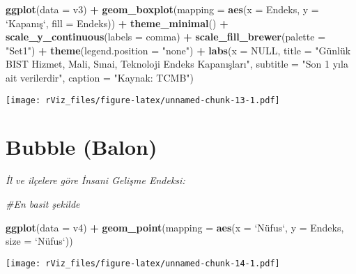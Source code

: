 \documentclass[
]{book}
\newenvironment{Shaded}{\begin{snugshade}}{\end{snugshade}}
\newcommand{\CommentTok}[1]{\textcolor[rgb]{0.56,0.35,0.01}{\textit{#1}}}
\newcommand{\DataTypeTok}[1]{\textcolor[rgb]{0.13,0.29,0.53}{#1}}
\newcommand{\KeywordTok}[1]{\textcolor[rgb]{0.13,0.29,0.53}{\textbf{#1}}}
\newcommand{\NormalTok}[1]{#1}
\newcommand{\OperatorTok}[1]{\textcolor[rgb]{0.81,0.36,0.00}{\textbf{#1}}}
\newcommand{\OtherTok}[1]{\textcolor[rgb]{0.56,0.35,0.01}{#1}}
\newcommand{\StringTok}[1]{\textcolor[rgb]{0.31,0.60,0.02}{#1}}
\begin{document}
\begin{Shaded}
\begin{Highlighting}[]
\KeywordTok{ggplot}\NormalTok{(}\DataTypeTok{data =}\NormalTok{ v3) }\OperatorTok{+}
\StringTok{  }\KeywordTok{geom_boxplot}\NormalTok{(}\DataTypeTok{mapping =} \KeywordTok{aes}\NormalTok{(}\DataTypeTok{x =}\NormalTok{ Endeks, }\DataTypeTok{y =} \StringTok{`}\DataTypeTok{Kapanış}\StringTok{`}\NormalTok{, }\DataTypeTok{fill =}\NormalTok{ Endeks)) }\OperatorTok{+}
\StringTok{  }\KeywordTok{theme_minimal}\NormalTok{() }\OperatorTok{+}
\StringTok{  }\KeywordTok{scale_y_continuous}\NormalTok{(}\DataTypeTok{labels =}\NormalTok{ comma) }\OperatorTok{+}
\StringTok{  }\KeywordTok{scale_fill_brewer}\NormalTok{(}\DataTypeTok{palette =} \StringTok{"Set1"}\NormalTok{) }\OperatorTok{+}
\StringTok{  }\KeywordTok{theme}\NormalTok{(}\DataTypeTok{legend.position =} \StringTok{"none"}\NormalTok{) }\OperatorTok{+}
\StringTok{  }\KeywordTok{labs}\NormalTok{(}\DataTypeTok{x =} \OtherTok{NULL}\NormalTok{,}
       \DataTypeTok{title =} \StringTok{"Günlük BIST Hizmet, Mali, Sınai, Teknoloji Endeks Kapanışları"}\NormalTok{,}
       \DataTypeTok{subtitle =} \StringTok{"Son 1 yıla ait verilerdir"}\NormalTok{,}
       \DataTypeTok{caption =} \StringTok{"Kaynak: TCMB"}\NormalTok{)}
\end{Highlighting}
\end{Shaded}

\texttt{[image: rViz\_files/figure-latex/unnamed-chunk-13-1.pdf]}

\hypertarget{bubble-balon}{%
\section{Bubble (Balon)}\label{bubble-balon}}

\emph{İl ve ilçelere göre İnsani Gelişme Endeksi:}

\begin{Shaded}
\begin{Highlighting}[]
\CommentTok{#En basit şekilde}

\KeywordTok{ggplot}\NormalTok{(}\DataTypeTok{data =}\NormalTok{ v4) }\OperatorTok{+}
\StringTok{  }\KeywordTok{geom_point}\NormalTok{(}\DataTypeTok{mapping =} \KeywordTok{aes}\NormalTok{(}\DataTypeTok{x =} \StringTok{`}\DataTypeTok{Nüfus`, y = Endeks, size = }\StringTok{`}\NormalTok{Nüfus`))}
\end{Highlighting}
\end{Shaded}

\texttt{[image: rViz\_files/figure-latex/unnamed-chunk-14-1.pdf]}
\end{document}
